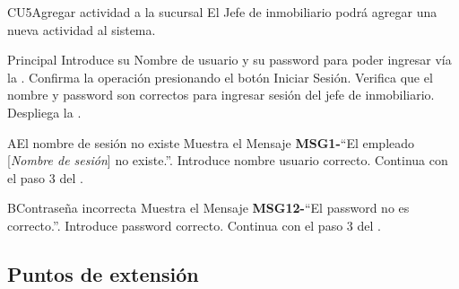 
\begin{UseCase}{CU5}{Agregar actividad a la sucursal}{
		El Jefe de inmobiliario podrá agregar una nueva actividad al sistema.
	}
\end{UseCase}
\begin{UCtrayectoria}{Principal}
	\UCpaso[\UCactor] Introduce su Nombre de usuario y su password para poder ingresar vía la  \label{CU1LoginJI}.
	\UCpaso[\UCactor] Confirma la operación presionando el botón Iniciar Sesión.
	\UCpaso Verifica que el nombre y password son correctos para ingresar sesión del jefe de inmobiliario.
	\UCpaso Despliega la .
\end{UCtrayectoria}

\begin{UCtrayectoriaA}{A}{El nombre de sesión no existe}
	\UCpaso[\UCactor] Muestra el Mensaje {\bf MSG1-}``El empleado [{\em Nombre de sesión}] no existe.''.
	\UCpaso[\UCactor] Introduce nombre usuario correcto.
	\UCpaso[] Continua con el paso 3 del .
\end{UCtrayectoriaA}

\begin{UCtrayectoriaA}{B}{Contraseña incorrecta}
	\UCpaso Muestra el Mensaje {\bf MSG12-}``El password no es correcto.''.
	\UCpaso[\UCactor] Introduce password correcto.
	\UCpaso[] Continua con el paso 3 del .
\end{UCtrayectoriaA}


\subsection{Puntos de extensión}
